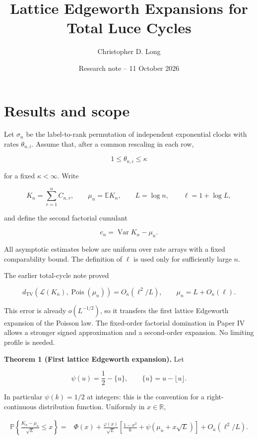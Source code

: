 \documentclass[
  11pt,
]{article}
\title{Lattice Edgeworth Expansions for Total Luce Cycles}
\author{Christopher D. Long}
\date{Research note -- 11 October 2026}
\begin{document}
\maketitle

\section{Results and scope}\label{results-and-scope}

Let \(\sigma_n\) be the label-to-rank permutation of independent
exponential clocks with rates \(\theta_{n,i}\). Assume that, after a
common rescaling in each row,

\[
1\le\theta_{n,i}\le\kappa
\]

for a fixed \(\kappa<\infty\). Write

\[
K_n=\sum_{r=1}^n C_{n,r},\qquad
\mu_n=\mathbb E K_n,\qquad
L=\log n,\qquad
\ell=1+\log L,
\]

and define the second factorial cumulant

\[
c_n=\operatorname{Var}K_n-\mu_n.
\]

All asymptotic estimates below are uniform over rate arrays with a fixed
comparability bound. The definition of \(\ell\) is used only for
sufficiently large \(n\).

The earlier total-cycle note proved

\[
d_{\mathrm{TV}}(\mathcal L(K_n),\operatorname{Pois}(\mu_n))
=O_\kappa(\ell^2/L),\qquad
\mu_n=L+O_\kappa(\ell).
\tag{1}
\]

This error is already \(o(L^{-1/2})\), so it transfers the first lattice
Edgeworth expansion of the Poisson law. The fixed-order factorial
domination in Paper IV allows a stronger signed approximation and a
second-order expansion. No limiting profile is needed.


\textbf{Theorem 1 (First lattice Edgeworth expansion).} Let

\[
\psi(u)=\frac12-\{u\},\qquad \{u\}=u-\lfloor u\rfloor.
\]

In particular \(\psi(k)=1/2\) at integers: this is the convention for a
right-continuous distribution function. Uniformly in \(x\in\mathbb R\),

\[
\begin{split}
\mathbb P\left\{\frac{K_n-\mu_n}{\sqrt L}\le x\right\}
={}&\Phi(x)+\frac{\varphi(x)}{\sqrt L}
\left[\frac{1-x^2}{6}+\psi(\mu_n+x\sqrt L)\right]
+O_\kappa(\ell^2/L).
\end{split}
\tag{2}
\]
\end{document}
